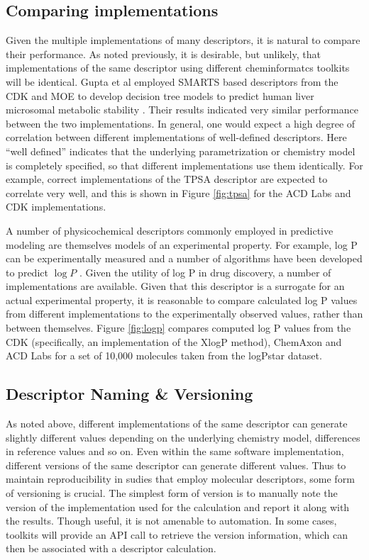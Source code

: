 \documentclass[letterpaper, 12pt]{article}
\begin{document}
\subsection{Comparing implementations}
\label{sec:comp-impl}


Given the multiple implementations of many descriptors, it is natural
to compare their performance. As noted previously, it is desirable,
but unlikely, that implementations of the same descriptor using
different cheminformatcs toolkits will be identical. Gupta et al
employed SMARTS based descriptors from the CDK and MOE to develop
decision tree models to predict human liver microsomal metabolic
stability \cite{Gupta:2010uq}. Their results indicated very similar
performance between the two implementations. In general, one would
expect a high degree of correlation between different implementations
of well-defined descriptors. Here ``well defined'' indicates that the
underlying parametrization or chemistry model is completely specified,
so that different implementations use them identically. For example,
correct implementations of the TPSA descriptor are expected to
correlate very well, and this is shown in Figure \ref{fig:tpsa} for
the ACD Labs and CDK implementations.

A number of physicochemical descriptors commonly employed in
predictive modeling are themselves models of an experimental
property. For example, log P can be experimentally measured and a
number of algorithms have been developed to predict $\log P$
\cite{Wang:1997aa,Wildman:1999aa}. Given the utility of log P in drug
discovery, a number of implementations are available. Given that this
descriptor is a surrogate for an actual experimental property, it is
reasonable to compare calculated log P values from different
implementations to the experimentally observed values, rather than
between themselves. Figure \ref{fig:logp} compares computed log P
values from the CDK (specifically, an implementation of the XlogP
method), ChemAxon and ACD Labs for a set of 10,000 molecules taken
from the logPstar dataset.

\subsection{Descriptor Naming \& Versioning}
\label{sec:descr-vers}

As noted above, different implementations of the same descriptor can
generate slightly different values depending on the underlying
chemistry model, differences in reference values and so on. Even
within the same software implementation, different versions of the
same descriptor can generate different values. Thus to maintain
reproducibility in sudies that employ molecular descriptors, some form
of versioning is crucial. The simplest form of version is to manually
note the version of the implementation used for the calculation and
report it along with the results. Though useful, it is not amenable to
automation. In some cases, toolkits will provide an API call to
retrieve the version information, which can then be associated with a
descriptor calculation. 
\end{document}
